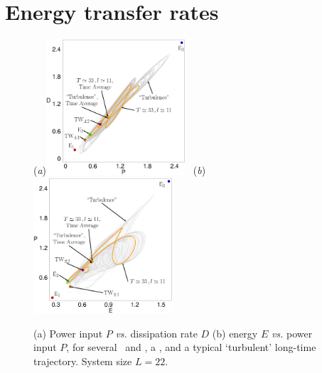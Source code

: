 \section{Energy transfer rates} %
\label{sec:energyL22}

\begin{figure}[t]
\begin{center}
(\textit{a})\!\!\!\!\includegraphics[width=0.46\textwidth]{figs/energyBalance_pst.eps}%
~(\textit{b})\!\!\!\!\includegraphics[width=0.46\textwidth]{figs/equivaEP_pst.eps}
\end{center}
\caption{
(a) Power input $P$ {\em vs.}
dissipation rate $D$
(b) energy $E$  {\em vs.}
power input $P$,   for several  \eqva\ and \reqva,
a \rpo , and a typical `turbulent' long-time trajectory.
System size $L=22$.
        }
\label{f:drivedrag}
\end{figure}

